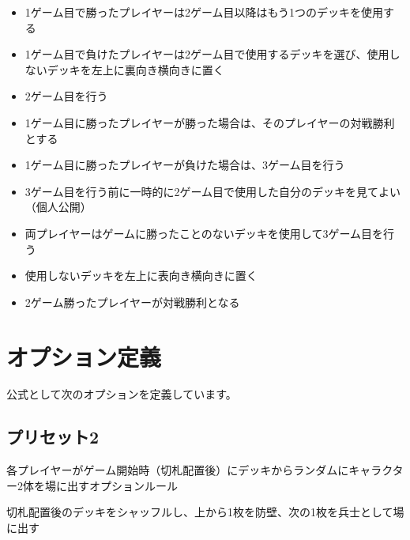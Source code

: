 \documentclass[letterpaper,10pt,dvipdfmx]{sphinxmanual}
\begin{document}
\begin{description}
\begin{itemize}
\item {} 
\sphinxAtStartPar
1ゲーム目で勝ったプレイヤーは2ゲーム目以降はもう1つのデッキを使用する

\item {} 
\sphinxAtStartPar
1ゲーム目で負けたプレイヤーは2ゲーム目で使用するデッキを選び、使用しないデッキを左上に裏向き横向きに置く

\item {} 
\sphinxAtStartPar
2ゲーム目を行う

\item {} 
\sphinxAtStartPar
1ゲーム目に勝ったプレイヤーが勝った場合は、そのプレイヤーの対戦勝利とする

\item {} 
\sphinxAtStartPar
1ゲーム目に勝ったプレイヤーが負けた場合は、3ゲーム目を行う

\item {} 
\sphinxAtStartPar
3ゲーム目を行う前に一時的に2ゲーム目で使用した自分のデッキを見てよい（個人公開）

\item {} 
\sphinxAtStartPar
両プレイヤーはゲームに勝ったことのないデッキを使用して3ゲーム目を行う

\item {} 
\sphinxAtStartPar
使用しないデッキを左上に表向き横向きに置く

\item {} 
\sphinxAtStartPar
2ゲーム勝ったプレイヤーが対戦勝利となる

\end{itemize}

\end{description}


\section{オプション定義}
\label{\detokenize{match-regulations/match-regulations:id8}}
\sphinxAtStartPar
公式として次のオプションを定義しています。


\subsection{プリセット2}
\label{\detokenize{match-regulations/match-regulations:id9}}
\sphinxAtStartPar
各プレイヤーがゲーム開始時（切札配置後）にデッキからランダムにキャラクター2体を場に出すオプションルール

\sphinxAtStartPar
切札配置後のデッキをシャッフルし、上から1枚を防壁、次の1枚を兵士として場に出す
\end{document}
